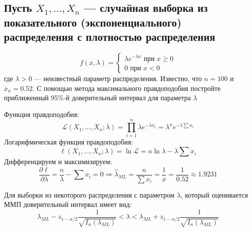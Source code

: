\documentclass{article}
\begin{document}
\subsection{Пусть $X_{1}, \ldots, X_{n}$ — случайная выборка из показательного (экспоненциального) распределения с плотностью распределения}
\begin{equation*}
    f(x, \lambda)=\begin{cases}
        \lambda e^{-\lambda x} \text { при } x \geq 0 \\
        0 \text { при } x<0
    \end{cases}
\end{equation*}
где $\lambda>0$ — неизвестный параметр распределения. Известно, что $n=100$ и $\overline{x}_{n}=0.52$.
С помощью метода максимального правдоподобия постройте приближенный $95 \%$-й доверительный интервал для параметра $\lambda$

Функция правдоподобия:
\begin{equation*}
    \mathcal{L}(X_1, \dots, X_n; \lambda) = \prod_{i=1}^n \lambda e^{-\lambda x_i} = \lambda^n e^{-\lambda \sum x_i}
\end{equation*}
Логарифмическая функция правдоподобия:
\begin{equation*}
    \ell(X_1, \dots, X_n; \lambda) = \ln \mathcal{L} = n \ln \lambda - \lambda \sum x_i
\end{equation*}
Дифференцируем и максимизируем:
\begin{equation*}
    \frac{\partial\ell}{\partial\lambda} = \frac{n}{\lambda} - \sum x_i = 0 \Longrightarrow \widehat{\lambda}_{ML} = \frac{n}{\sum x_i} = \frac{1}{\overline{x}} = \frac{1}{0.52} \approx 1.9231
\end{equation*}

Для выборки из некоторого распределения с параметром $\lambda$, который оценивается ММП доверительный интервал имеет вид:
\begin{equation*}
    \lambda_{M L}-z_{1-\alpha / 2} \frac{1}{\sqrt{I_n\left(\lambda_{M L}\right)}} < \lambda < \lambda_{M L}+z_{1-\alpha / 2} \frac{1}{\sqrt{I_n\left(\lambda_{M L}\right)}}
\end{equation*}
\end{document}
